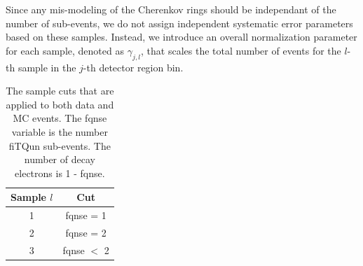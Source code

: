 Since any mis-modeling of the Cherenkov rings should be independant of the
number of sub-events, we do not assign independent systematic error parameters
based on these samples. Instead, we introduce an overall normalization
parameter for each sample, denoted as $\gamma_{j,l}$, that scales the total
number of events for the $l$-th sample in the $j$-th detector region bin. 

\begin{table}
  \centering
  \begin{tabular}{c | c}
    \hline\hline
    Sample $l$ & Cut \\
    \hline
    1 & fqnse = 1 \\
    2 & fqnse = 2 \\
    3 & fqnse $<$ 2 \\
    \hline\hline
  \end{tabular}
  \caption{The sample cuts that are applied to both data and MC events. The
  fqnse variable is the number fiTQun sub-events. The number of decay electrons
  is 1 - fqnse. }
  \label{tab:samples}
\end{table}


